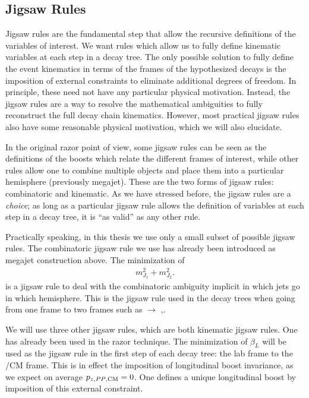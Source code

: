 \subsection{Jigsaw Rules}

Jigsaw rules are the fundamental step that allow the recursive definitions of the variables of interest.
We want rules which allow us to fully define kinematic variables at each step in a decay tree.
The only possible solution to fully define the event kinematics in terms of the frames of the hypothesized decays is the imposition of external constraints to eliminate additional degrees of freedom.
In principle, these need not have any particular physical motivation.
Instead, the jigsaw rules are a way to resolve the mathematical ambiguities to fully reconstruct the full decay chain kinematics.
However, most practical jigsaw rules also have some reasonable physical motivation, which we will also elucidate.

In the original razor point of view, some jigsaw rules can be seen as the definitions of the boosts which relate the different frames of interest, while other rules allow one to combine multiple objects and place them into a particular hemisphere (previously megajet).
These are the two forms of jigsaw rules: combinatoric and kinematic.
As we have stressed before, the jigsaw rules are a \textit{choice}; as long as a particular jigsaw rule allows the definition of variables at each step in a decay tree, it is ``as valid'' as any other rule.

Practically speaking, in this thesis we use only a small subset of possible jigsaw rules.
The combinatoric jigsaw rule we use has already been introduced as megajet construction above.
The minimization of
\begin{align}
m_{J_1}^2 + m_{J_2}^2.
\end{align}
is a jigsaw rule to deal with the combinatoric ambiguity implicit in which jets go in which hemisphere.
This is the jigsaw rule used in the decay trees when going from one frame to two frames such as \PP $\rightarrow$ \Pa,\Pb.

We will use three other jigsaw rules, which are both kinematic jigsaw rules.
One has already been used in the razor technique.
The minimization of $\beta_L$ will be used as the jigsaw rule in the first step of each decay tree: the lab frame to the \PP/CM frame.
This is in effect the imposition of longitudinal boost invariance, as we expect on average $p_{z,\text{\ensuremath{PP},CM}} = 0$.
One defines a unique longitudinal boost by imposition of this external constraint.

